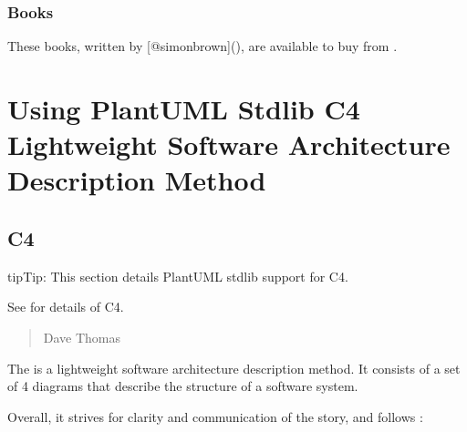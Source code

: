 \documentclass[letterpaper,10pt,english]{sphinxmanual}
\begin{document}
\subsubsection{Books}
\label{\detokenize{C4/c4:books}}
These books, written by {[}@simonbrown{]}(),
are available to buy from
.

  


\section{Using PlantUML Stdlib C4 Lightweight Software Architecture Description Method}
\label{\detokenize{C4/C4Stdlib:using-plantuml-stdlib-c4-lightweight-software-architecture-description-method}}\label{\detokenize{C4/C4Stdlib:c4plantuml-label}}\label{\detokenize{C4/C4Stdlib::doc}}

\subsection{C4}
\label{\detokenize{C4/C4Stdlib:c4}}
\begin{sphinxadmonition}{tip}{Tip:}
This section details PlantUML stdlib support for C4.

See {\hyperref[\detokenize{C4/c4:c4-label}]{}} for details of C4.
\end{sphinxadmonition}
\begin{quote}

 Dave Thomas
\end{quote}

The  is a lightweight software
architecture description method. It consists of a set of 4 diagrams that
describe the  structure of a software system.

Overall, it strives for clarity and communication of the story, and
follows :
\begin{quote}

\end{quote}
\end{document}
